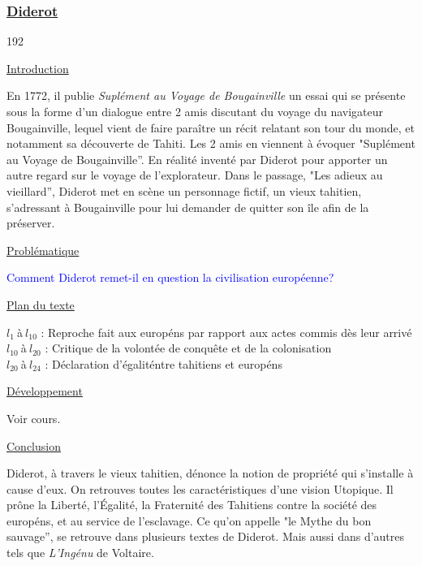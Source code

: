 \documentclass[12pt,a4paper]{article}
\begin{document}
			\subsubsection{\href{.extra/Bio/Diderot.pdf}{Diderot}}
\begin{dingautolist}{192}

\item \underline{Introduction} \par
	En 1772, il publie \textit{Supl\'ement au Voyage de Bougainville} un essai qui se pr\'esente sous la forme d'un dialogue entre 2 amis discutant du voyage du navigateur Bougainville, 
	lequel vient de faire para\^itre un r\'ecit relatant son tour du monde, et notamment sa d\'ecouverte de Tahiti.
	Les 2 amis en viennent \`a \'evoquer "Supl\'ement au Voyage de Bougainville''. En r\'ealit\'e invent\'e par Diderot pour apporter un autre regard sur le voyage de l'explorateur.
	Dans le passage, "Les adieux au vieillard'', Diderot met en sc\`ene un personnage fictif, un vieux tahitien, s'adressant \`a Bougainville pour lui demander de quitter son \^ile afin de la pr\'eserver.

\item \underline{Probl\'ematique }\par
	\textcolor{blue}{Comment Diderot remet-il en question la civilisation europ\'eenne?}

\item \underline{Plan du texte} \par
	$l_{1}~$\`a$~l_{10}$ : Reproche fait aux europ\'ens par rapport aux actes commis d\`es leur arriv\'e\\
	$l_{10}~$\`a$~l_{20}$ : Critique de la volont\'ee de conquête et de la colonisation\\
	$l_{20}~$\`a$~l_{24}$ : D\'eclaration d'\'egalit\' entre tahitiens et europ\'ens 

\item \underline{D\'eveloppement} \par
        Voir cours.

\item \underline{Conclusion} \par
	Diderot, \`a travers le vieux tahitien, d\'enonce la notion de propri\'et\'e qui s'installe \`a cause d'eux.
	On retrouves toutes les caract\'eristiques d'une vision Utopique.
	Il prône la Libert\'e, l'\'Egalit\'e, la Fraternit\'e des Tahitiens contre la soci\'et\'e des europ\'ens, et au service de l'esclavage.
	Ce qu'on appelle "le Mythe du bon sauvage'', se retrouve dans plusieurs textes de Diderot. Mais aussi dans d'autres tels que \textit{L'Ing\'enu} de Voltaire.

\end{dingautolist}
 \newpage
\end{document}
